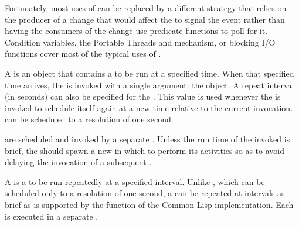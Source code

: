 Fortunately, most uses of  can be replaced by a different
strategy that relies on the producer of a change that would affect the
  to signal the event rather than
having the consumers of the change use predicate functions to poll for it.
Condition variables, the Portable Threads \textbf{}
and \textbf{} mechanism, or blocking I/O functions
cover most of the typical uses of .


A  is an object that contains a  to
be run at a specified time. When that specified time arrives, the
 is invoked with a single argument: the
 object. A repeat interval (in seconds) can also be
specified for the . This value is used whenever the
 is invoked to schedule itself again at a new time
relative to the current invocation.   can be
scheduled to a resolution of one second.

 are scheduled and invoked by a separate
 .  Unless the run time of
the invoked  is brief, the  should spawn a new
 in which to perform its activities so as to avoid delaying the
invocation of a subsequent .


A  is a  to be run repeatedly at a
specified interval.  Unlike , which can be
scheduled only to a resolution of one second, a  can
be repeated at intervals as brief as is supported by the  function
of the Common Lisp implementation.  Each  is executed
in a separate .

\W\entities
\T\clearpage


